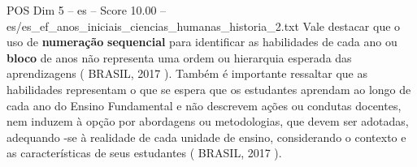 \begin{textsample}{POS Dim 5 – es – Score 10.00 – es/es\_ef\_anos\_iniciais\_ciencias\_humanas\_historia\_2.txt}
Vale destacar que o uso de \textbf{numeração} \textbf{sequencial} para identificar as habilidades de cada ano ou \textbf{bloco} de anos não representa uma ordem ou hierarquia esperada das aprendizagens ( BRASIL, 2017 ).
Também é importante ressaltar que as habilidades representam o que se espera que os estudantes aprendam ao longo de cada ano do Ensino Fundamental e não descrevem ações ou condutas docentes, nem induzem à opção por abordagens ou metodologias, que devem ser adotadas, adequando -se à realidade de cada unidade de ensino, considerando o contexto e as características de seus estudantes ( BRASIL, 2017 ).

\end{textsample}
